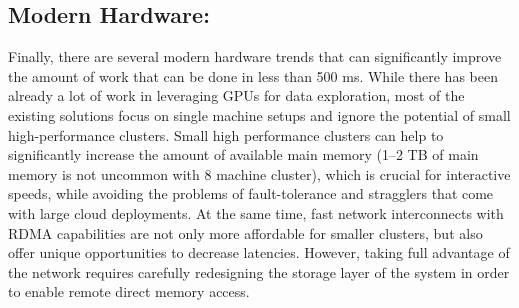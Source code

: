 \documentclass[12pt,letterpaper, onecolumn]{exam}
\begin{document}
    \subsection{Modern Hardware:} Finally, there are several modern hardware trends that can significantly improve the amount of work that can be done in less than 500 ms. While there has been already a lot of work in leveraging GPUs for data exploration, most of the existing solutions focus on single machine setups and ignore the potential of small high-performance clusters. Small high performance clusters can help to significantly increase the amount of available main memory (1–2 TB of main memory is not uncommon with 8 machine cluster), which is crucial for interactive speeds, while avoiding the problems of fault-tolerance and stragglers that come with large cloud deployments. At the same time, fast network interconnects with RDMA capabilities are not only more affordable for smaller clusters, but also offer unique opportunities to decrease latencies. However, taking full advantage of the network requires carefully redesigning the storage layer of the system in order to enable remote direct memory access.
\end{document}
